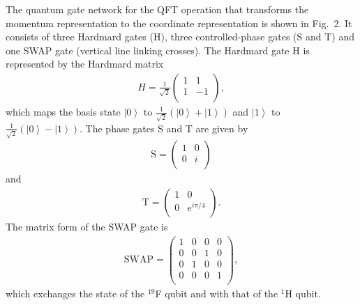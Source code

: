 \documentclass[twocolumn,showpacs,twoside,10pt,prl]{revtex4}
\begin{document}
The quantum gate network for the QFT operation that transforms the momentum representation to the coordinate representation is shown in Fig.~2. It consists of three Hardmard gates (H), three controlled-phase gates (S and T) and one SWAP gate (vertical line linking crosses).
The Hardmard gate H is represented by the Hardmard matrix
\begin{eqnarray}\label{Hardmard}
H = \frac{1}{\sqrt{2}}\left(
  \begin{array}{cc}
    1 & 1 \\
    1 & -1 \\
  \end{array}
\right),
\end{eqnarray}
which maps the basis state $\left\vert 0 \right\rangle$ to $\frac{1}{\sqrt{2}}(\left\vert 0 \right\rangle+\left\vert 1 \right\rangle)$ and $\left\vert 1 \right\rangle$ to $\frac{1}{\sqrt{2}}(\left\vert 0 \right\rangle-\left\vert 1 \right\rangle)$. The phase gates S and T are given by
\begin{eqnarray}\label{phasegate}
\text{S} = \left(
  \begin{array}{cc}
    1 & 0 \\
    0 & i \\
  \end{array}
\right)
\end{eqnarray}
and
\begin{eqnarray}\label{phasegate}
\text{T} = \left(
  \begin{array}{cc}
    1 & 0 \\
    0 & e^{i\pi/4} \\
  \end{array}
\right).
\end{eqnarray}
The matrix form of the SWAP gate is
\begin{eqnarray}\label{SWAP}
\text{SWAP} = \left(
         \begin{array}{cccc}
           1 & 0 & 0 & 0 \\
           0 & 0 & 1 & 0 \\
           0 & 1 & 0 & 0 \\
           0 & 0 & 0 & 1 \\
         \end{array}
       \right),
\end{eqnarray}
which exchanges the state of the $^{19}$F qubit and with that of the $^1$H qubit.
\end{document}
